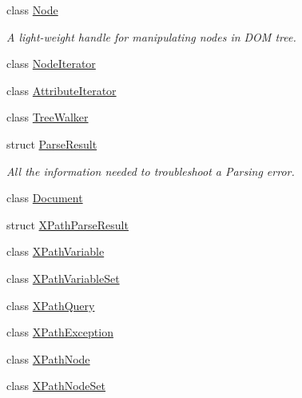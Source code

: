 \begin{DoxyCompactItemize}
class \hyperlink{classphys_1_1xml_1_1Node}{Node}
\begin{DoxyCompactList}\small\item\em A light-\/weight handle for manipulating nodes in DOM tree. \item\end{DoxyCompactList}\item 
class \hyperlink{classphys_1_1xml_1_1NodeIterator}{NodeIterator}
\item 
class \hyperlink{classphys_1_1xml_1_1AttributeIterator}{AttributeIterator}
\item 
class \hyperlink{classphys_1_1xml_1_1TreeWalker}{TreeWalker}
\item 
struct \hyperlink{structphys_1_1xml_1_1ParseResult}{ParseResult}
\begin{DoxyCompactList}\small\item\em All the information needed to troubleshoot a Parsing error. \item\end{DoxyCompactList}\item 
class \hyperlink{classphys_1_1xml_1_1Document}{Document}
\item 
struct \hyperlink{structphys_1_1xml_1_1XPathParseResult}{XPathParseResult}
\item 
class \hyperlink{classphys_1_1xml_1_1XPathVariable}{XPathVariable}
\item 
class \hyperlink{classphys_1_1xml_1_1XPathVariableSet}{XPathVariableSet}
\item 
class \hyperlink{classphys_1_1xml_1_1XPathQuery}{XPathQuery}
\item 
class \hyperlink{classphys_1_1xml_1_1XPathException}{XPathException}
\item 
class \hyperlink{classphys_1_1xml_1_1XPathNode}{XPathNode}
\item 
class \hyperlink{classphys_1_1xml_1_1XPathNodeSet}{XPathNodeSet}
\end{DoxyCompactItemize}
